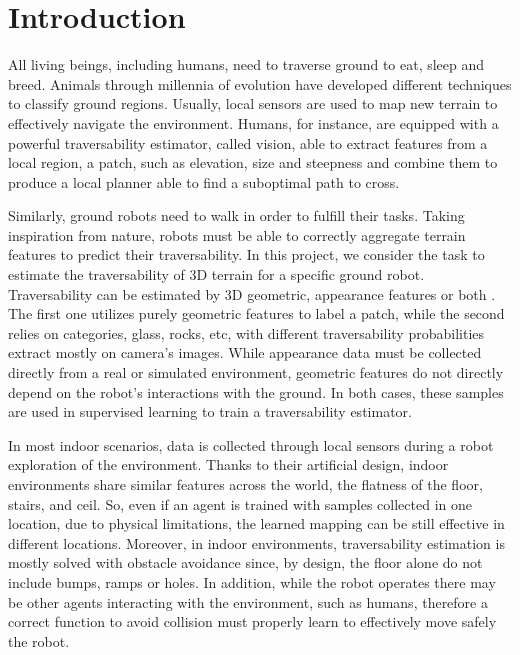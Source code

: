 \documentclass[../document.tex]{subfiles}
\begin{document}
\chapter{Introduction}

All living beings, including humans, need to traverse ground to eat, sleep and breed. Animals through millennia of evolution have developed different techniques to classify ground regions. Usually, local sensors are used to map new terrain to effectively navigate the environment. Humans, for instance, are equipped with a powerful traversability estimator, called vision,  able to extract features from a local region, a patch, such as elevation, size and steepness and combine them to produce a local planner able to find a suboptimal path to cross.

Similarly, ground robots need to walk in order to fulfill their tasks. Taking inspiration from nature, robots must be able to correctly aggregate terrain features to predict their traversability. In this project, we consider the task to estimate the traversability of 3D terrain for a specific ground robot. Traversability can be estimated by 3D geometric, appearance features or both \cite{papadakis}. The first one utilizes purely geometric features to label a patch, while the second relies on categories, glass, rocks, etc, with different traversability probabilities extract mostly on camera's images. While appearance data must be collected directly from a real or simulated environment, geometric features do not directly depend on the robot's interactions with the ground. In both cases, these samples are used in supervised learning to train a traversability estimator.

In most indoor scenarios, data is collected through local sensors during a robot exploration of the environment. Thanks to their artificial design, indoor environments share similar features across the world, the flatness of the floor, stairs, and ceil. So, even if an agent is trained with samples collected in one location, due to physical limitations, the learned mapping can be still effective in different locations. Moreover, in indoor environments, traversability estimation is mostly solved with obstacle avoidance since, by design, the floor alone do not include bumps, ramps or holes. In addition, while the robot operates there may be other agents interacting with the environment, such as humans, therefore a correct function to avoid collision must properly learn to effectively move safely the robot.
\end{document}
